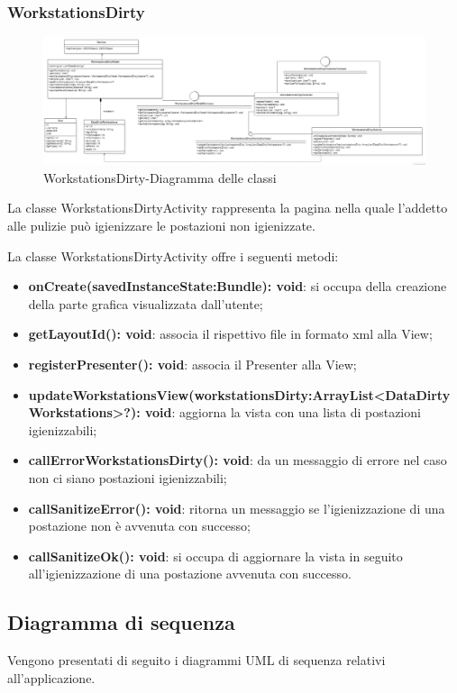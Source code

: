 \subsubsection{WorkstationsDirty}
\begin{figure}[H]
	\centering
	\includegraphics[width=16cm]{res/images/WorkstationsDirty.png}
	\caption{WorkstationsDirty-Diagramma delle classi}
	\label{fig:WorkstationsDirty-Diagramma delle classi}
\end{figure}
La classe WorkstationsDirtyActivity rappresenta la pagina nella quale l'addetto alle pulizie può igienizzare le postazioni non igienizzate.

La classe WorkstationsDirtyActivity offre i seguenti metodi:
\begin{itemize}
	\item \textbf{onCreate(savedInstanceState:Bundle): void}: si occupa della creazione della parte grafica visualizzata dall'utente; 
	\item \textbf{getLayoutId(): void}: associa il rispettivo file in formato xml alla View;
	\item \textbf{registerPresenter(): void}: associa il Presenter alla View; 
	\item \textbf{updateWorkstationsView(workstationsDirty:ArrayList<DataDirtyWorkstations>?): void}: aggiorna la vista con una lista di postazioni igienizzabili; 
	\item \textbf{callErrorWorkstationsDirty(): void}: da un messaggio di errore nel caso non ci siano postazioni igienizzabili;
	\item \textbf{callSanitizeError(): void}: ritorna un messaggio se l'igienizzazione di una postazione non è avvenuta con successo; 
	\item \textbf{callSanitizeOk(): void}: si occupa di aggiornare la vista in seguito all'igienizzazione di una postazione avvenuta con successo.
\end{itemize}

\subsection{Diagramma di sequenza}
Vengono presentati di seguito i diagrammi UML di sequenza relativi all'applicazione.

